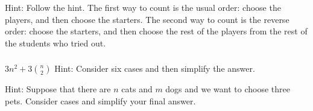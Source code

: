 \subsubsection*{ \answers}
    Hint: Follow the hint.  The first way to count is the usual order: choose the players, and then choose the starters.  The second way to count is the reverse order: choose the starters, and then choose the rest of the players from the rest of the students who tried out.

\subsubsection*{ \answers}
    \begin{apart}
        \item $3n^2+3\binom{n}{2}$  Hint: Consider six cases and then simplify the answer.
        \item Hint: Suppose that there are $n$ cats and $m$ dogs and we want to choose three pets.  Consider cases and simplify your final answer.
    \end{apart}








